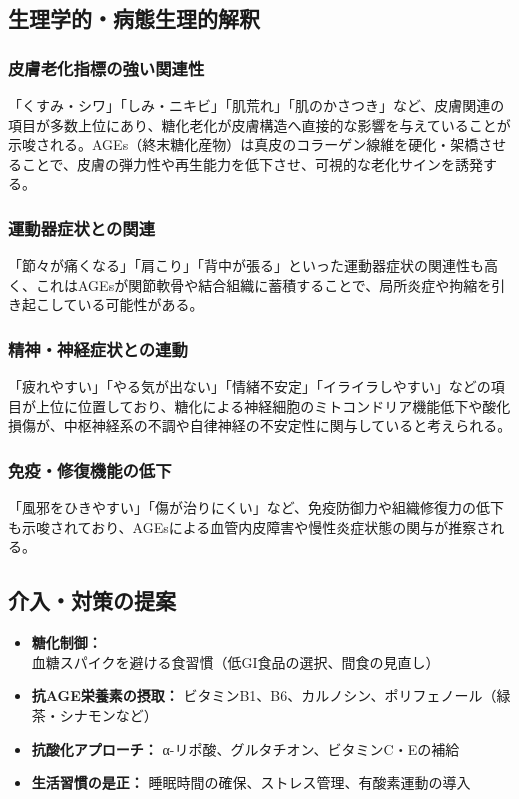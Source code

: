 \documentclass[a4paper,12pt]{article}
\begin{document}
\subsection*{生理学的・病態生理的解釈}

\subsubsection*{皮膚老化指標の強い関連性}
「くすみ・シワ」「しみ・ニキビ」「肌荒れ」「肌のかさつき」など、皮膚関連の項目が多数上位にあり、糖化老化が皮膚構造へ直接的な影響を与えていることが示唆される。AGEs（終末糖化産物）は真皮のコラーゲン線維を硬化・架橋させることで、皮膚の弾力性や再生能力を低下させ、可視的な老化サインを誘発する。

\subsubsection*{運動器症状との関連}
「節々が痛くなる」「肩こり」「背中が張る」といった運動器症状の関連性も高く、これはAGEsが関節軟骨や結合組織に蓄積することで、局所炎症や拘縮を引き起こしている可能性がある。

\subsubsection*{精神・神経症状との連動}
「疲れやすい」「やる気が出ない」「情緒不安定」「イライラしやすい」などの項目が上位に位置しており、糖化による神経細胞のミトコンドリア機能低下や酸化損傷が、中枢神経系の不調や自律神経の不安定性に関与していると考えられる。

\subsubsection*{免疫・修復機能の低下}
「風邪をひきやすい」「傷が治りにくい」など、免疫防御力や組織修復力の低下も示唆されており、AGEsによる血管内皮障害や慢性炎症状態の関与が推察される。

\subsection*{介入・対策の提案}

\begin{itemize}
    \item \textbf{糖化制御：} 血糖スパイクを避ける食習慣（低GI食品の選択、間食の見直し）
    \item \textbf{抗AGE栄養素の摂取：} ビタミンB1、B6、カルノシン、ポリフェノール（緑茶・シナモンなど）
    \item \textbf{抗酸化アプローチ：} α-リポ酸、グルタチオン、ビタミンC・Eの補給
    \item \textbf{生活習慣の是正：} 睡眠時間の確保、ストレス管理、有酸素運動の導入
\end{itemize}
\end{document}
